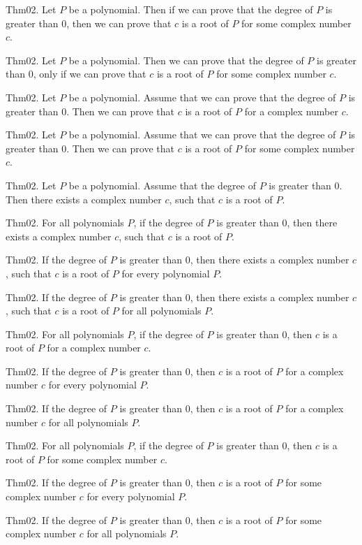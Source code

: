 \documentclass{article}
\begin{document}
Thm02. Let $P$ be a polynomial. Then if we can prove that the degree of $P$ is greater than $0$, then we can prove that $c$ is a root of $P$ for some complex number $c$.

Thm02. Let $P$ be a polynomial. Then we can prove that the degree of $P$ is greater than $0$, only if we can prove that $c$ is a root of $P$ for some complex number $c$.

Thm02. Let $P$ be a polynomial. Assume that we can prove that the degree of $P$ is greater than $0$. Then we can prove that $c$ is a root of $P$ for a complex number $c$.

Thm02. Let $P$ be a polynomial. Assume that we can prove that the degree of $P$ is greater than $0$. Then we can prove that $c$ is a root of $P$ for some complex number $c$.

Thm02. Let $P$ be a polynomial. Assume that the degree of $P$ is greater than $0$. Then there exists a complex number $c$, such that $c$ is a root of $P$.

Thm02. For all polynomials $P$, if the degree of $P$ is greater than $0$, then there exists a complex number $c$, such that $c$ is a root of $P$.

Thm02. If the degree of $P$ is greater than $0$, then there exists a complex number $c$, such that $c$ is a root of $P$ for every polynomial $P$.

Thm02. If the degree of $P$ is greater than $0$, then there exists a complex number $c$, such that $c$ is a root of $P$ for all polynomials $P$.

Thm02. For all polynomials $P$, if the degree of $P$ is greater than $0$, then $c$ is a root of $P$ for a complex number $c$.

Thm02. If the degree of $P$ is greater than $0$, then $c$ is a root of $P$ for a complex number $c$ for every polynomial $P$.

Thm02. If the degree of $P$ is greater than $0$, then $c$ is a root of $P$ for a complex number $c$ for all polynomials $P$.

Thm02. For all polynomials $P$, if the degree of $P$ is greater than $0$, then $c$ is a root of $P$ for some complex number $c$.

Thm02. If the degree of $P$ is greater than $0$, then $c$ is a root of $P$ for some complex number $c$ for every polynomial $P$.

Thm02. If the degree of $P$ is greater than $0$, then $c$ is a root of $P$ for some complex number $c$ for all polynomials $P$.
\end{document}
